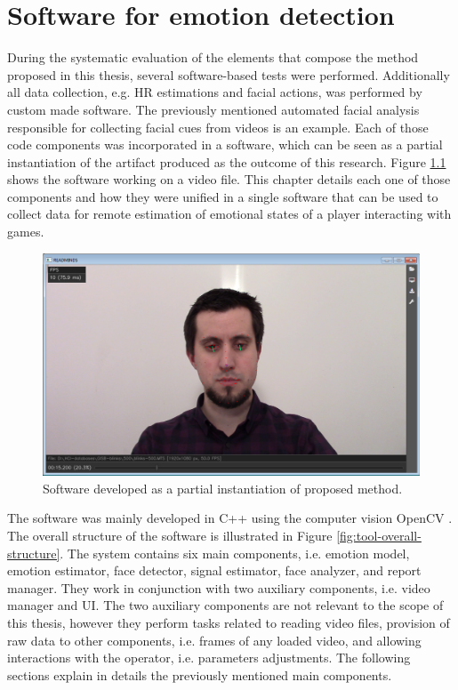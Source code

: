 \chapter{Software for emotion detection}
\label{ch:software}

During the systematic evaluation of the elements that compose the method proposed in this thesis, several software-based tests were performed. Additionally all data collection, e.g. HR estimations and facial actions, was performed by custom made software. The previously mentioned automated facial analysis responsible for collecting facial cues from videos is an example. Each of those code components was incorporated in a software, which can be seen as a partial instantiation of the artifact produced as the outcome of this research. Figure \ref{fig:readmind-main-window} shows the software working on a video file. This chapter details each one of those components and how they were unified in a single software that can be used to collect data for remote estimation of emotional states of a player interacting with games.

\begin{figure}[h!]
    \centering
    \includegraphics[width=\textwidth]{figures/tool-main-window.png}
    \caption{Software developed as a partial instantiation of proposed method.}
    \label{fig:readmind-main-window}
\end{figure}

The software was mainly developed in C++ using the computer vision OpenCV \parencite{opencv_library}. The overall structure of the software is illustrated in Figure \ref{fig:tool-overall-structure}. The system contains six main components, i.e. emotion model, emotion estimator, face detector, signal estimator, face analyzer, and report manager. They work in conjunction with two auxiliary components, i.e. video manager and UI. The two auxiliary components are not relevant to the scope of this thesis, however they perform tasks related to reading video files, provision of raw data to other components, i.e. frames of any loaded video, and allowing interactions with the operator, i.e. parameters adjustments. The following sections explain in details the previously mentioned main components.

